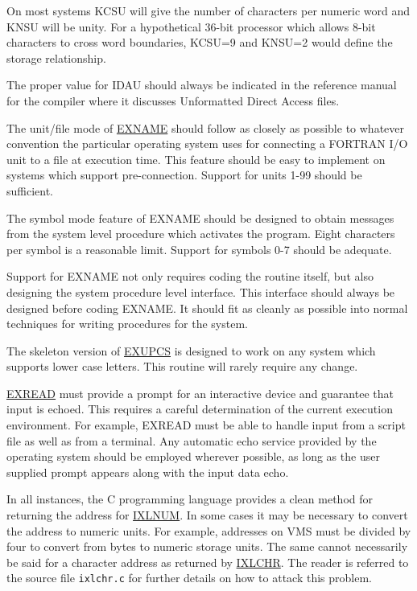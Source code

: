 On most systems KCSU will give the number of characters per numeric word and
KNSU will be unity.  For a hypothetical 36-bit processor which allows 8-bit
characters to cross word boundaries, KCSU=9 and KNSU=2 would define the
storage relationship.

The proper value for IDAU should always be indicated in the reference manual
for the compiler where it discusses Unformatted Direct Access files.

The unit/file mode of \underline{EXNAME} should follow as closely as
possible to whatever convention the particular operating system uses for
connecting a FORTRAN I/O unit to a file at execution time.  This feature
should be easy to implement on systems which support pre-connection.  Support
for units 1-99 should be sufficient. 

The symbol mode feature of EXNAME should be designed to obtain messages from
the system level procedure which activates the program.  Eight characters
per symbol is a reasonable limit.  Support for symbols 0-7 should be
adequate.

Support for EXNAME not only requires coding the routine itself, but also
designing the system procedure level interface.  This interface should
always be designed before coding EXNAME.  It should fit as cleanly as
possible into normal techniques for writing procedures for the system.

The skeleton version of \underline{EXUPCS} is designed to work on any system
which supports lower case letters.  This routine will rarely require any
change. 

\underline{EXREAD} must provide a prompt for an interactive device and
guarantee that input is echoed.  This requires a careful determination of
the current execution environment.  For example, EXREAD must be able to
handle input from a script file as well as from a terminal.  Any automatic
echo service provided by the operating system should be employed wherever
possible, as long as the user supplied prompt appears along with the input
data echo. 

In all instances,
the C programming language provides a clean method for returning the
address for \underline{IXLNUM}\@. In some cases it may be necessary to
convert the address to numeric units.  For example, addresses on VMS must be
divided by four to convert from bytes to numeric storage units. 
The same cannot necessarily be said for a character address
as returned by \underline{IXLCHR}\@.
The reader is referred to the source file \verb+ixlchr.c+ for further details
on how to attack this problem.

